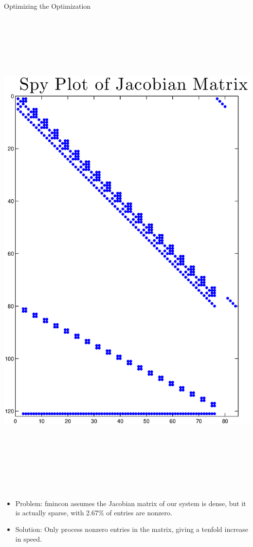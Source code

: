 \documentclass[final]{beamer}
\begin{document}
\begin{frame}{}
{\begin{columns}[t]
\begin{column}{.30\linewidth}
\begin{block}{\centering Optimizing the Optimization}
\centering\includegraphics[height=26cm, width=26cm]{figures/Spy_Jacobian.eps} 



	\begin{itemize}
		\setlength{\itemindent}{0.32in}
		\item Problem: fmincon assumes the Jacobian matrix of our system is dense, but it is actually
			sparse, with 2.67\% of entries are nonzero.
		\item Solution: Only process nonzero entries in the matrix, giving a tenfold increase in speed. 
	\end{itemize}


\end{block}
\end{column}
\end{columns}}
\end{frame}
\end{document}
